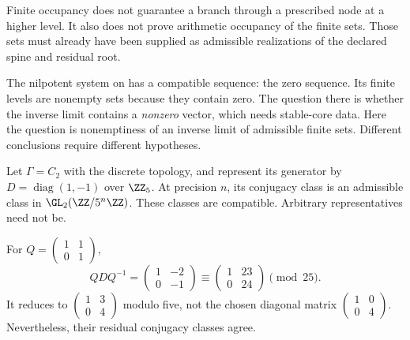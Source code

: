Finite occupancy does not guarantee a branch through a prescribed node at a higher level. It also does not prove arithmetic occupancy of the finite sets. Those sets must already have been supplied as admissible realizations of the declared spine and residual root.

The nilpotent system on  has a compatible sequence: the zero sequence. Its finite levels are nonempty sets because they contain zero. The question there is whether the inverse limit contains a \emph{nonzero} vector, which needs stable-core data. Here the question is nonemptiness of an inverse limit of admissible finite sets. Different conclusions require different hypotheses.


Let $\Gamma=C_2$ with the discrete topology, and represent its generator by $D=\operatorname{diag}(1,-1)$ over $\ZZ_5$. At precision $n$, its conjugacy class is an admissible class in $\GL_2(\ZZ/5^n\ZZ)$. These classes are compatible. Arbitrary representatives need not be.


For $Q=\left(\begin{smallmatrix}1&1\\0&1\end{smallmatrix}\right)$,
\[
QDQ^{-1}=\begin{pmatrix}1&-2\\0&-1\end{pmatrix}
\equiv\begin{pmatrix}1&23\\0&24\end{pmatrix}\pmod{25}.
\]
It reduces to $\left(\begin{smallmatrix}1&3\\0&4\end{smallmatrix}\right)$ modulo five, not the chosen diagonal matrix $\left(\begin{smallmatrix}1&0\\0&4\end{smallmatrix}\right)$. Nevertheless, their residual conjugacy classes agree.


